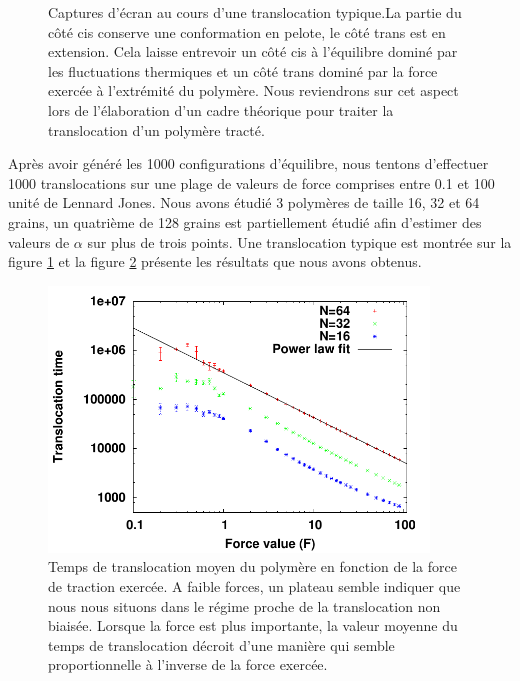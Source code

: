 \begin{figure}[H]
\begin{minipage}{0.5\linewidth}
\end{minipage}
\begin{minipage}{0.5\linewidth} 
\caption[Capture d'écran de la translocation du polymère simple]{Captures d'écran au cours d'une translocation typique.La partie du côté cis conserve une conformation en pelote, le côté trans est en extension. Cela laisse entrevoir un côté cis à l'équilibre dominé par les fluctuations thermiques et un côté trans dominé par la force exercée à l’extrémité du polymère. Nous reviendrons sur cet aspect lors de l'élaboration d'un cadre théorique pour traiter la translocation d'un polymère tracté.}
\label{screenshotspolsimple}
\end{minipage}
\end{figure}



\noindent Après avoir généré les 1000 configurations d'équilibre, nous tentons d'effectuer 1000 translocations sur une plage de valeurs de force comprises entre 0.1 et 100 unité de Lennard Jones. Nous avons étudié 3 polymères de taille 16, 32 et 64 grains, un quatrième de 128 grains est partiellement étudié afin d'estimer des valeurs de $\alpha$ sur plus de trois points. Une translocation typique est montrée sur la figure \ref{screenshotspolsimple} et la figure \ref{taupolsimple} présente les résultats que nous avons obtenus.
 
\begin{figure}[H]
\begin{center}
\includegraphics[width=0.9\textwidth]{translocpolsimple.pdf} 
\caption[Temps de translocations du polymère simple]{Temps de translocation moyen du polymère en fonction de la force de traction exercée. A faible forces, un plateau semble indiquer  que nous nous situons dans le régime proche de la translocation non biaisée. Lorsque la force est plus importante, la valeur moyenne du temps de translocation décroit d'une manière qui semble proportionnelle à l'inverse de la force exercée.}
\label{taupolsimple}
\end{center}
\end{figure}

